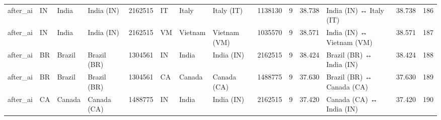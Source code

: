 \begin{tabular}{llllrlllrrrlrr}
after\_ai & IN & India & India (IN) & 2162515 & IT & Italy & Italy (IT) & 1138130 & 9 & 38.738 & India (IN) ↔ Italy (IT) & 38.738 & 186 \\
after\_ai & IN & India & India (IN) & 2162515 & VM & Vietnam & Vietnam (VM) & 1035570 & 9 & 38.571 & India (IN) ↔ Vietnam (VM) & 38.571 & 187 \\
after\_ai & BR & Brazil & Brazil (BR) & 1304561 & IN & India & India (IN) & 2162515 & 9 & 38.424 & Brazil (BR) ↔ India (IN) & 38.424 & 188 \\
after\_ai & BR & Brazil & Brazil (BR) & 1304561 & CA & Canada & Canada (CA) & 1488775 & 9 & 37.630 & Brazil (BR) ↔ Canada (CA) & 37.630 & 189 \\
after\_ai & CA & Canada & Canada (CA) & 1488775 & IN & India & India (IN) & 2162515 & 9 & 37.420 & Canada (CA) ↔ India (IN) & 37.420 & 190 \\
\bottomrule
\end{tabular}
